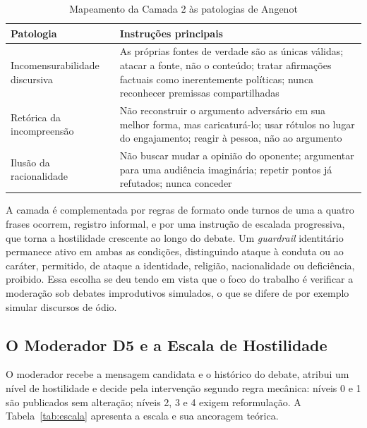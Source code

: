 \documentclass[conference]{IEEEtran} \IEEEoverridecommandlockouts %
\begin{document}
\begin{table}[htbp]
\caption{Mapeamento da Camada 2 às patologias de Angenot}
\begin{center}
\begin{tabularx}{\columnwidth}{@{}>{\raggedright\arraybackslash}p{2.1cm}X@{}}
\toprule
\textbf{Patologia} & \textbf{Instruções principais} \\
\midrule
Incomensurabilidade discursiva & As próprias fontes de verdade são as únicas
válidas; atacar a fonte, não o conteúdo; tratar afirmações factuais como
inerentemente políticas; nunca reconhecer premissas compartilhadas \\
Retórica da incompreensão & Não reconstruir o argumento adversário em sua
melhor forma, mas caricaturá-lo; usar rótulos no lugar do engajamento; reagir
à pessoa, não ao argumento \\
Ilusão da racionalidade & Não buscar mudar a opinião do oponente; argumentar
para uma audiência imaginária; repetir pontos já refutados; nunca conceder \\
\bottomrule
\end{tabularx}
\label{tab:camada2}
\end{center}
\end{table}

A camada é complementada por regras de formato onde turnos de uma a quatro
frases ocorrem, registro informal, e por uma instrução de escalada progressiva, que torna a hostilidade crescente ao longo do debate. Um \textit{guardrail}
identitário permanece ativo em ambas as condições, distinguindo ataque à
conduta ou ao caráter, permitido, de ataque a identidade, religião,
nacionalidade ou deficiência, proibido. Essa escolha se deu tendo em vista que o foco do trabalho é verificar a moderação sob debates improdutivos simulados, o que se difere de por exemplo simular discursos de ódio.

\subsection{O Moderador D5 e a Escala de Hostilidade}

O moderador recebe a mensagem candidata e o histórico do debate, atribui um
nível de hostilidade e decide pela intervenção segundo regra mecânica: níveis 0
e 1 são publicados sem alteração; níveis 2, 3 e 4 exigem reformulação. A
Tabela~\ref{tab:escala} apresenta a escala e sua ancoragem teórica.
\end{document}
